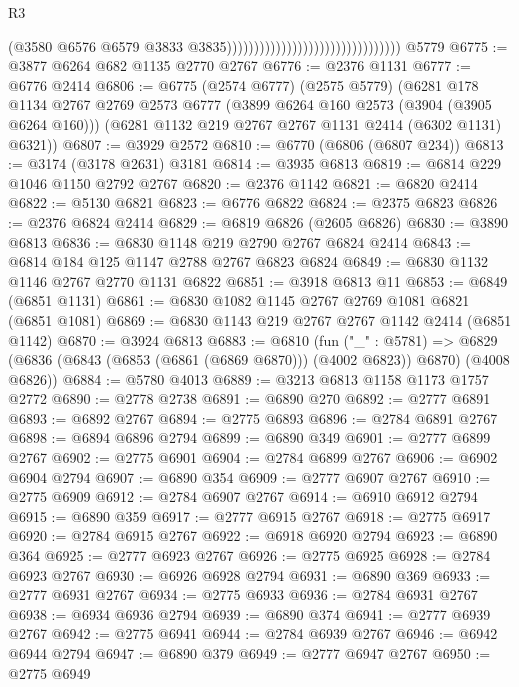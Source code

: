 \begin{lexlean}{R3}
\begin{coremodule}
                                                                  (@3580
                                                                    @6576
                                                                    @6579
                                                                    @3833
                                                                    @3835))))))))))))))))))))))))))))))))
    @5779
@6775 := @3877 @6264 @682 @1135 @2770 @2767
@6776 := @2376 @1131
@6777 := @6776 @2414
@6806 := @6775
    (@2574 @6777)
    (@2575 @5779)
    (@6281
      @178
      @1134
      @2767
      @2769
      @2573
      @6777
      (@3899 @6264 @160 @2573 (@3904 (@3905 @6264 @160)))
      (@6281 @1132 @219 @2767 @2767 @1131 @2414 (@6302 @1131) @6321))
@6807 := @3929 @2572
@6810 := @6770 (@6806 (@6807 @234))
@6813 := @3174 (@3178 @2631) @3181
@6814 := @3935 @6813
@6819 := @6814 @229 @1046 @1150 @2792 @2767
@6820 := @2376 @1142
@6821 := @6820 @2414
@6822 := @5130 @6821
@6823 := @6776 @6822
@6824 := @2375 @6823
@6826 := @2376 @6824 @2414
@6829 := @6819 @6826 (@2605 @6826)
@6830 := @3890 @6813
@6836 := @6830 @1148 @219 @2790 @2767 @6824 @2414
@6843 := @6814 @184 @125 @1147 @2788 @2767 @6823 @6824
@6849 := @6830 @1132 @1146 @2767 @2770 @1131 @6822
@6851 := @3918 @6813 @11
@6853 := @6849 (@6851 @1131)
@6861 := @6830 @1082 @1145 @2767 @2769 @1081 @6821 (@6851 @1081)
@6869 := @6830 @1143 @219 @2767 @2767 @1142 @2414 (@6851 @1142)
@6870 := @3924 @6813
@6883 := @6810
    (fun ("_" : @5781) =>
    @6829 (@6836 (@6843 (@6853 (@6861 (@6869 @6870))) (@4002 @6823)) @6870) (@4008 @6826))
@6884 := @5780 @4013
@6889 := @3213 @6813 @1158 @1173 @1757 @2772
@6890 := @2778 @2738
@6891 := @6890 @270
@6892 := @2777 @6891
@6893 := @6892 @2767
@6894 := @2775 @6893
@6896 := @2784 @6891 @2767
@6898 := @6894 @6896 @2794
@6899 := @6890 @349
@6901 := @2777 @6899 @2767
@6902 := @2775 @6901
@6904 := @2784 @6899 @2767
@6906 := @6902 @6904 @2794
@6907 := @6890 @354
@6909 := @2777 @6907 @2767
@6910 := @2775 @6909
@6912 := @2784 @6907 @2767
@6914 := @6910 @6912 @2794
@6915 := @6890 @359
@6917 := @2777 @6915 @2767
@6918 := @2775 @6917
@6920 := @2784 @6915 @2767
@6922 := @6918 @6920 @2794
@6923 := @6890 @364
@6925 := @2777 @6923 @2767
@6926 := @2775 @6925
@6928 := @2784 @6923 @2767
@6930 := @6926 @6928 @2794
@6931 := @6890 @369
@6933 := @2777 @6931 @2767
@6934 := @2775 @6933
@6936 := @2784 @6931 @2767
@6938 := @6934 @6936 @2794
@6939 := @6890 @374
@6941 := @2777 @6939 @2767
@6942 := @2775 @6941
@6944 := @2784 @6939 @2767
@6946 := @6942 @6944 @2794
@6947 := @6890 @379
@6949 := @2777 @6947 @2767
@6950 := @2775 @6949

\end{coremodule}
\end{lexlean}
